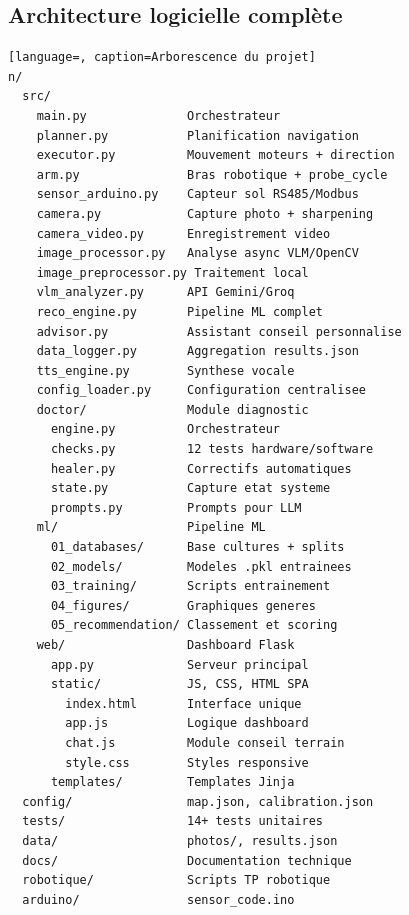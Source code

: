 \documentclass[a4paper,12pt,openany,titlepage]{scrartcl}
\begin{document}
\subsection{Architecture logicielle complète}
\begin{lstlisting}[language=, caption=Arborescence du projet]
n/
  src/
    main.py              Orchestrateur
    planner.py           Planification navigation
    executor.py          Mouvement moteurs + direction
    arm.py               Bras robotique + probe_cycle
    sensor_arduino.py    Capteur sol RS485/Modbus
    camera.py            Capture photo + sharpening
    camera_video.py      Enregistrement video
    image_processor.py   Analyse async VLM/OpenCV
    image_preprocessor.py Traitement local
    vlm_analyzer.py      API Gemini/Groq
    reco_engine.py       Pipeline ML complet
    advisor.py           Assistant conseil personnalise
    data_logger.py       Aggregation results.json
    tts_engine.py        Synthese vocale
    config_loader.py     Configuration centralisee
    doctor/              Module diagnostic
      engine.py          Orchestrateur
      checks.py          12 tests hardware/software
      healer.py          Correctifs automatiques
      state.py           Capture etat systeme
      prompts.py         Prompts pour LLM
    ml/                  Pipeline ML
      01_databases/      Base cultures + splits
      02_models/         Modeles .pkl entrainees
      03_training/       Scripts entrainement
      04_figures/        Graphiques generes
      05_recommendation/ Classement et scoring
    web/                 Dashboard Flask
      app.py             Serveur principal
      static/            JS, CSS, HTML SPA
        index.html       Interface unique
        app.js           Logique dashboard
        chat.js          Module conseil terrain
        style.css        Styles responsive
      templates/         Templates Jinja
  config/                map.json, calibration.json
  tests/                 14+ tests unitaires
  data/                  photos/, results.json
  docs/                  Documentation technique
  robotique/             Scripts TP robotique
  arduino/               sensor_code.ino
\end{lstlisting}
\end{document}
